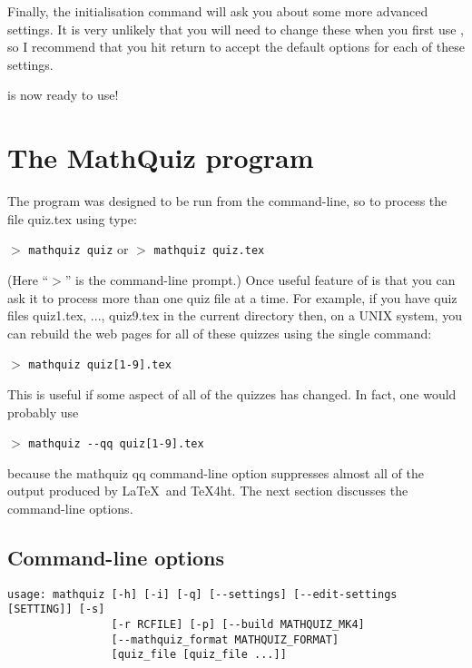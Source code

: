\documentclass[svgnames]{article}
\newcommand\ddash{\texttt{\textemdash\textemdash}}
\newcommand\mathquizopt[1]{\textsf{mathquiz \ddash#1}}
\begin{document}
     Finally, the initialisation command will ask you about some more
     advanced settings. It is very unlikely that you will need to change
     these when you first use \MathQuiz, so I recommend that you hit
     return to accept the default options for each of these settings.

    \bigskip

    \MathQuiz is now ready to use!


\section{The MathQuiz program}
    The \MathQuiz program was designed to be run from the command-line,
    so to process the file \textsf{quiz.tex} using \MathQuiz type:

    $>$ \Verb|mathquiz quiz| \qquad or \qquad $>$ \Verb|mathquiz quiz.tex|

    \noindent (Here ``$>$'' is the command-line prompt.) Once useful
    feature of \MathQuiz is that you can ask it to process more than one
    quiz file at a time. For example, if you have quiz files
    \textsf{quiz1.tex}, ..., \textsf{quiz9.tex} in the current directory
    then, on a UNIX system, you can rebuild the web pages for all of
    these quizzes using the single command:

    $>$ \Verb|mathquiz quiz[1-9].tex|

    \noindent
    This is useful if some aspect of all of the quizzes has changed. In
    fact, one would probably use

    $>$ \Verb|mathquiz --qq quiz[1-9].tex|

    \noindent
    because the \mathquizopt{qq} command-line option suppresses almost all of
    the output produced by \LaTeX\ and \TeX4ht. The next section
    discusses the \MathQuiz command-line options.

    \subsection{Command-line options}\label{SS:commandline}

\begin{verbatim}
usage: mathquiz [-h] [-i] [-q] [--settings] [--edit-settings  [SETTING]] [-s]
                [-r RCFILE] [-p] [--build MATHQUIZ_MK4]
                [--mathquiz_format MATHQUIZ_FORMAT]
                [quiz_file [quiz_file ...]]
\end{verbatim}
\end{document}
